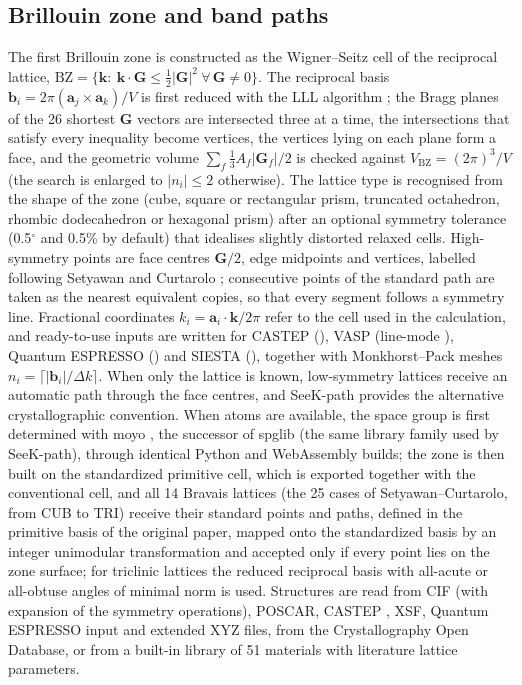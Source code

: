 \subsection{Brillouin zone and band paths}\label{sec:bz}
The first Brillouin zone is constructed as the Wigner--Seitz cell of the reciprocal lattice, $\mathrm{BZ}=\{\bm k:\ \bm k\cdot\mathbf G\le\tfrac12|\mathbf G|^2\ \forall\,\mathbf G\neq0\}$. The reciprocal basis $\mathbf b_i=2\pi(\mathbf a_j\times\mathbf a_k)/V$ is first reduced with the LLL algorithm \cite{lenstra1982}; the Bragg planes of the 26 shortest $\mathbf G$ vectors are intersected three at a time, the intersections that satisfy every inequality become vertices, the vertices lying on each plane form a face, and the geometric volume $\sum_f\tfrac13A_f|\mathbf G_f|/2$ is checked against $V_\mathrm{BZ}=(2\pi)^3/V$ (the search is enlarged to $|n_i|\le2$ otherwise). The lattice type is recognised from the shape of the zone (cube, square or rectangular prism, truncated octahedron, rhombic dodecahedron or hexagonal prism) after an optional symmetry tolerance (0.5$^\circ$ and 0.5\% by default) that idealises slightly distorted relaxed cells. High-symmetry points are face centres $\mathbf G/2$, edge midpoints and vertices, labelled following Setyawan and Curtarolo \cite{setyawan2010}; consecutive points of the standard path are taken as the nearest equivalent copies, so that every segment follows a symmetry line. Fractional coordinates $k_i=\mathbf a_i\cdot\bm k/2\pi$ refer to the cell used in the calculation, and ready-to-use inputs are written for CASTEP (), VASP (line-mode ), Quantum ESPRESSO () and SIESTA (), together with Monkhorst--Pack meshes $n_i=\lceil|\mathbf b_i|/\Delta k\rceil$. When only the lattice is known, low-symmetry lattices receive an automatic path through the face centres, and SeeK-path \cite{hinuma2017} provides the alternative crystallographic convention. When atoms are available, the space group is first determined with moyo \cite{moyo}, the successor of spglib \cite{togo2024spglib} (the same library family used by SeeK-path), through identical Python and WebAssembly builds; the zone is then built on the standardized primitive cell, which is exported together with the conventional cell, and all 14 Bravais lattices (the 25 cases of Setyawan--Curtarolo, from CUB to TRI) receive their standard points and paths, defined in the primitive basis of the original paper, mapped onto the standardized basis by an integer unimodular transformation and accepted only if every point lies on the zone surface; for triclinic lattices the reduced reciprocal basis with all-acute or all-obtuse angles of minimal norm is used. Structures are read from CIF (with expansion of the symmetry operations), POSCAR, CASTEP , XSF, Quantum ESPRESSO input and extended XYZ files, from the Crystallography Open Database, or from a built-in library of 51 materials with literature lattice parameters.

